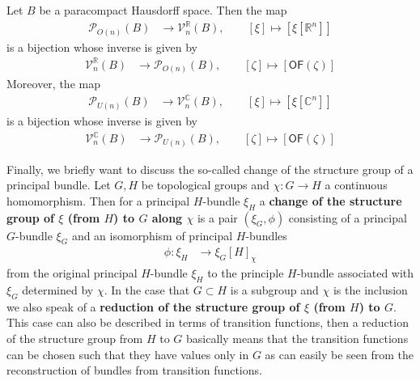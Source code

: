 \begin{thm}
\label{thm:prvecbundorth}
Let $B$ be a paracompact Hausdorff space. Then the map
\begin{align*}
  \mathcal{P}_{O(n)}(B)
  &\to
  \mathcal{V}_{n}^{\mathbb{R}}(B)
  ,\qquad
  [\xi]
  \mapsto
  [\xi[\mathbb{R}^{n}]]
\end{align*}
is a bijection whose inverse is given by
\begin{align*}
  \mathcal{V}_{n}^{\mathbb{R}}(B)
  &\to
  \mathcal{P}_{O(n)}(B)
  ,\qquad
  [\zeta]
  \mapsto
  [\mathsf{OF}(\zeta)]
\end{align*}
Moreover, the map
\begin{align*}
  \mathcal{P}_{U(n)}(B)
  &\to
  \mathcal{V}_{n}^{\mathbb{C}}(B)
  ,\qquad
  [\xi]
  \mapsto
  [\xi[\mathbb{C}^{n}]]
\end{align*}
is a bijection whose inverse is given by
\begin{align*}
  \mathcal{V}_{n}^{\mathbb{C}}(B)
  &\to
  \mathcal{P}_{U(n)}(B)
  ,\qquad
  [\zeta]
  \mapsto
  [\mathsf{OF}(\zeta)]
\end{align*}
\end{thm}
Finally, we briefly want to discuss the so-called change of the structure group of a principal bundle. Let $G,H$ be topological groups and $\chi \colon G \to H$ a continuous homomorphism. Then for a principal $H$-bundle $\xi_{H}$ a \textbf{change of the structure group of $\xi$ (from $H$) to $G$ along $\chi$} is a pair $(\xi_{G},\phi)$ consisting of a principal $G$-bundle $\xi_{G}$ and an isomorphism of principal $H$-bundles
\begin{align*}
  \phi
  \colon
  \xi_{H}
  &\to
  \xi_{G}[H]_{\chi}
\end{align*}
from the original principal $H$-bundle $\xi_{H}$ to the principle $H$-bundle associated with $\xi_{G}$ determined by $\chi$. In the case that $G \subset H$ is a subgroup and $\chi$ is the inclusion we also speak of a \textbf{reduction of the structure group of $\xi$ (from $H$) to $G$}. This case can also be described in terms of transition functions, then a reduction of the structure group from $H$ to $G$ basically means that the transition functions can be chosen such that they have values only in $G$ as can easily be seen from the reconstruction of bundles from transition functions.
\\
